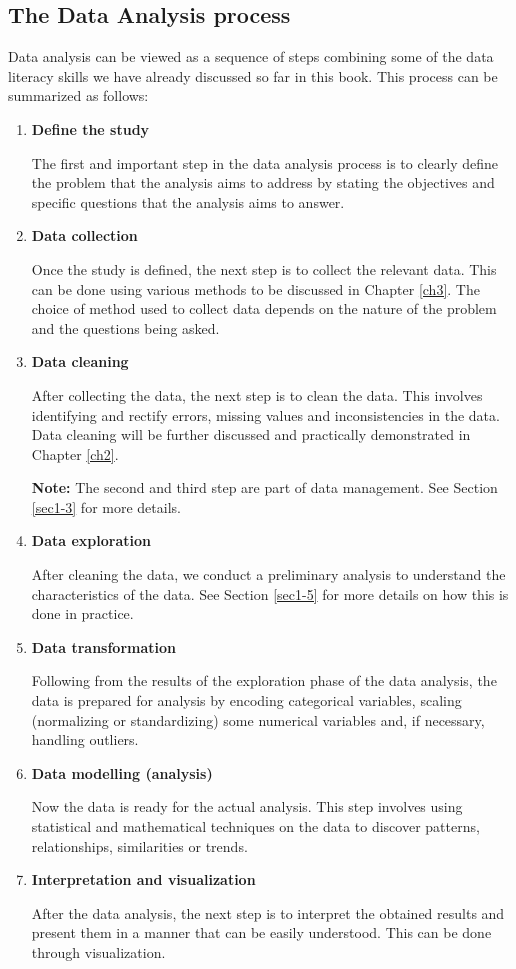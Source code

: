 \documentclass[
]{book}
\begin{document}
\subsection{The Data Analysis process}\label{the-data-analysis-process}

Data analysis can be viewed as a sequence of steps combining some of the data literacy skills we have already discussed so far in this book. This process can be summarized as follows:

\begin{enumerate}
\def\labelenumi{\arabic{enumi}.}
\item
  \textbf{Define the study}

  The first and important step in the data analysis process is to clearly define the problem that the analysis aims to address by stating the objectives and specific questions that the analysis aims to answer.
\item
  \textbf{Data collection}

  Once the study is defined, the next step is to collect the relevant data. This can be done using various methods to be discussed in Chapter \ref{ch3}. The choice of method used to collect data depends on the nature of the problem and the questions being asked.
\item
  \textbf{Data cleaning}

  After collecting the data, the next step is to clean the data. This involves identifying and rectify errors, missing values and inconsistencies in the data. Data cleaning will be further discussed and practically demonstrated in Chapter \ref{ch2}.

  \textbf{Note:} The second and third step are part of data management. See Section \ref{sec1-3} for more details.
\item
  \textbf{Data exploration}

  After cleaning the data, we conduct a preliminary analysis to understand the characteristics of the data. See Section \ref{sec1-5} for more details on how this is done in practice.
\item
  \textbf{Data transformation}

  Following from the results of the exploration phase of the data analysis, the data is prepared for analysis by encoding categorical variables, scaling (normalizing or standardizing) some numerical variables and, if necessary, handling outliers.
\item
  \textbf{Data modelling (analysis)}

  Now the data is ready for the actual analysis. This step involves using statistical and mathematical techniques on the data to discover patterns, relationships, similarities or trends.
\item
  \textbf{Interpretation and visualization}

  After the data analysis, the next step is to interpret the obtained results and present them in a manner that can be easily understood. This can be done through visualization.
\end{enumerate}
\end{document}
